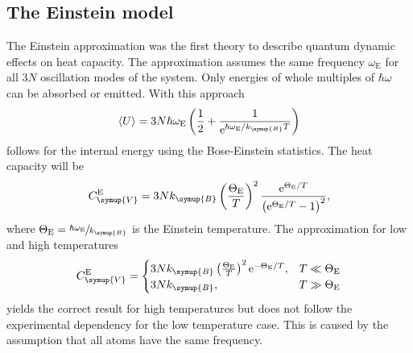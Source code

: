 \subsection{The Einstein model}
\label{subsec:Einstein}
The Einstein approximation was the first theory to describe quantum dynamic effects on heat capacity.
The approximation assumes the same frequency $\omega_\text{E}$ for all $3N$ oscillation modes of the system. Only energies of whole multiples of
$\hbar \omega$ can be absorbed or emitted. With this approach
\begin{equation*}
    \langle U \rangle = 3N \hbar \omega_\text{E} \left(\frac{1}{2} + \frac{1}{\mathrm{e}^{\hbar \omega_\text{E}/k_{\symup{B}}T}}\right)
\end{equation*}
follows for the internal energy using the Bose-Einstein statistics.
The heat capacity will be
\begin{equation}
    \label{eqn:CV_Einstein}
    C^\text{E}_{\symup{V}} = 3Nk_{\symup{B}} \left(\frac{\Theta_\text{E}}{T}\right)^2 \frac{\mathrm{e}^{\Theta_\text{E}/T}}{\left(\mathrm{e}^{\Theta_\text{E}/T} -1 \right)^2},
\end{equation}
where $\Theta_\text{E} = \sfrac{\hbar \omega_\text{E}}{k_{\symup{B}}}$ is the Einstein temperature.
The approximation for low and high temperatures
\begin{equation*}
    C^\text{E}_{\symup{V}} =
    \begin{cases}
        3Nk_{\symup{B}}\left(\frac{\Theta_\text{E}}{T}\right)^2 \mathrm{e}^{-\Theta_\text{E}/T}, & T \ll \Theta_\text{E}\\
        3Nk_{\symup{B}}, & T \gg \Theta_\text{E}\\
    \end{cases}
\end{equation*}
yields the correct result for high temperatures but does not follow the experimental dependency for the low temperature case.
This is caused by the assumption that all atoms have the same frequency.

